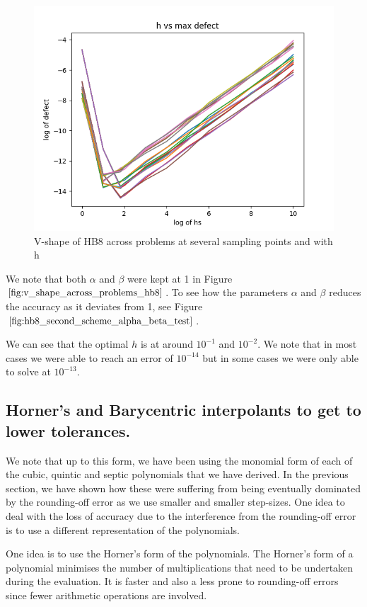 \begin{figure}[H]
\centering
\includegraphics[width=0.7\linewidth]{./figures/v_shape_across_problems_hb8}
\caption{V-shape of HB8 across problems at several sampling points and with h}
\label{fig:v_shape_across_problems_hb8}
\end{figure}

We note that both $\alpha$ and $\beta$ were kept at 1 in Figure $\ref{fig:v_shape_across_problems_hb8}$. To see how the parameters $\alpha$ and $\beta$ reduces the accuracy as it deviates from 1, see Figure $\ref{fig:hb8_second_scheme_alpha_beta_test}$.

We can see that the optimal $h$ is at around $10^{-1}$ and $10^{-2}$. We note that in most cases we were able to reach an error of $10^{-14}$ but in some cases we were only able to solve at $10^{-13}$. 

\subsection{Horner's and Barycentric interpolants to get to lower tolerances.}
\label{section:horner_bary_forms}
We note that up to this form, we have been using the monomial form of each of the cubic, quintic and septic polynomials that we have derived. In the previous section, we have shown how these were suffering from being eventually dominated by the rounding-off error as we use smaller and smaller step-sizes. One idea to deal with the loss of accuracy due to the interference from the rounding-off error is to use a different representation of the polynomials. 

One idea is to use the Horner's form of the polynomials. The Horner's form of a polynomial minimises the number of multiplications that need to be undertaken during the evaluation. It is faster and also a less prone to rounding-off errors since fewer arithmetic operations are involved.

